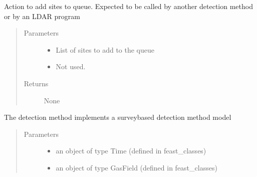 \documentclass[letterpaper,10pt,english]{sphinxmanual}
\begin{document}
\begin{fulllineitems}
\begin{fulllineitems}
\label{\detokenize{index:feast.DetectionModules.site_survey.SiteSurvey.action}}
Action to add sites to queue. Expected to be called by another detection method or by an LDAR program
\begin{quote}\begin{description}
\item[{Parameters}] \leavevmode\begin{itemize}
\item {} 
 \textendash{} List of sites to add to the queue

\item {} 
 \textendash{} Not used.

\end{itemize}

\item[{Returns}] \leavevmode
None

\end{description}\end{quote}

\end{fulllineitems}


\begin{fulllineitems}
\label{\detokenize{index:feast.DetectionModules.site_survey.SiteSurvey.detect}}
The detection method implements a survey\sphinxhyphen{}based detection method model
\begin{quote}\begin{description}
\item[{Parameters}] \leavevmode\begin{itemize}
\item {} 
 \textendash{} an object of type Time (defined in feast\_classes)

\item {} 
 \textendash{} an object of type GasField (defined in feast\_classes)


\end{itemize}
\end{description}
\end{quote}
\end{fulllineitems}
\end{fulllineitems}
\end{document}

